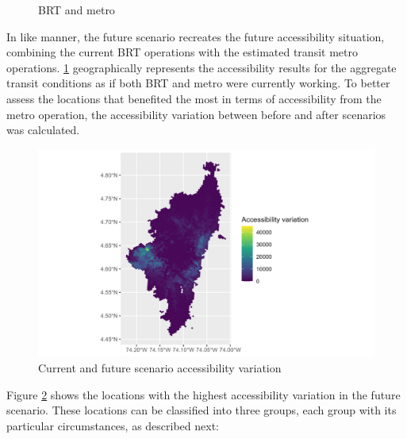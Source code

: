 \documentclass[12pt, a4paper]{report}
\begin{document}
\begin{figure}[H]
\begin{minipage}{0.45\textwidth}
         \caption{BRT and metro}
        \label{fig:Access_BRT_Metro_Base}
    \end{minipage}    
\end{figure}

In like manner, the future scenario recreates the future accessibility situation, combining the current BRT operations with the estimated transit metro operations. \ref{fig:Access_BRT_Metro_Base} geographically represents the accessibility results for the aggregate transit conditions as if both BRT and metro were currently working. To better assess the locations that benefited the most in terms of accessibility from the metro operation, the accessibility variation between before and after scenarios was calculated. 

\begin{figure}[H]
    \centering
    \includegraphics[width=14cm]{Data/Results/Images/Access_diff_BRT_Metro_base.png}
    \caption{Current and future scenario accessibility variation}
    \label{fig:Access_Variation}
\end{figure}

Figure \ref{fig:Access_Variation} shows the locations with the highest accessibility variation in the future scenario. These locations can be classified into three groups, each group with its particular circumstances, as described next:
\end{document}
